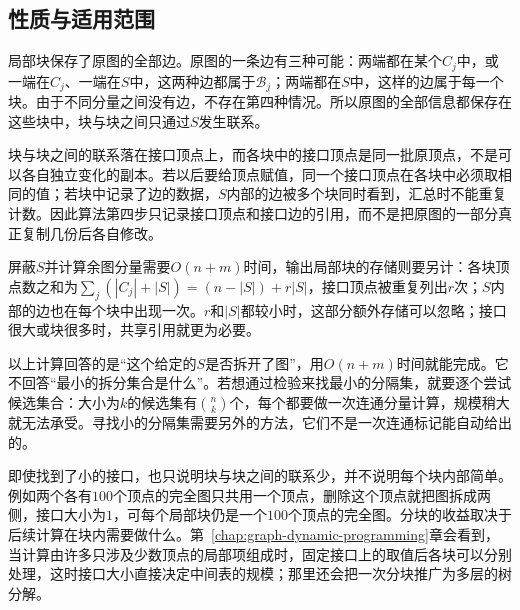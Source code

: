 \subsection{性质与适用范围}
\label{sec:graph-trav-blocks-interfaces}

局部块保存了原图的全部边。原图的一条边有三种可能：两端都在某个$C_j$中，或一端在$C_j$、一端在$S$中，这两种边都属于$\mathcal B_j$；两端都在$S$中，这样的边属于每一个块。由于不同分量之间没有边，不存在第四种情况。所以原图的全部信息都保存在这些块中，块与块之间只通过$S$发生联系。

块与块之间的联系落在接口顶点上，而各块中的接口顶点是同一批原顶点，不是可以各自独立变化的副本。若以后要给顶点赋值，同一个接口顶点在各块中必须取相同的值；若块中记录了边的数据，$S$内部的边被多个块同时看到，汇总时不能重复计数。因此算法第四步只记录接口顶点和接口边的引用，而不是把原图的一部分真正复制几份后各自修改。

屏蔽$S$并计算余图分量需要$O(n+m)$时间，输出局部块的存储则要另计：各块顶点数之和为$\sum_j(|C_j|+|S|)=(n-|S|)+r|S|$，接口顶点被重复列出$r$次；$S$内部的边也在每个块中出现一次。$r$和$|S|$都较小时，这部分额外存储可以忽略；接口很大或块很多时，共享引用就更为必要。

以上计算回答的是“这个给定的$S$是否拆开了图”，用$O(n+m)$时间就能完成。它不回答“最小的拆分集合是什么”。若想通过检验来找最小的分隔集，就要逐个尝试候选集合：大小为$k$的候选集有$\binom{n}{k}$个，每个都要做一次连通分量计算，规模稍大就无法承受。寻找小的分隔集需要另外的方法，它们不是一次连通标记能自动给出的。

即使找到了小的接口，也只说明块与块之间的联系少，并不说明每个块内部简单。例如两个各有$100$个顶点的完全图只共用一个顶点，删除这个顶点就把图拆成两侧，接口大小为$1$，可每个局部块仍是一个$100$个顶点的完全图。分块的收益取决于后续计算在块内需要做什么。第~\ref{chap:graph-dynamic-programming}章会看到，当计算由许多只涉及少数顶点的局部项组成时，固定接口上的取值后各块可以分别处理，这时接口大小直接决定中间表的规模；那里还会把一次分块推广为多层的树分解。
